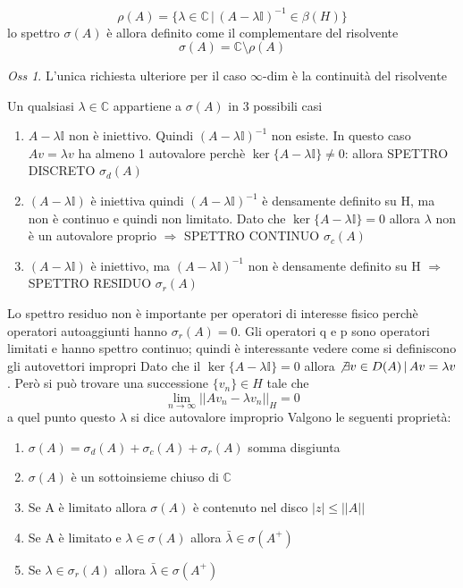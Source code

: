 \documentclass[a4paper,11pt]{report}
\theoremstyle{remark}
\newtheorem*{oss}{Oss}
\theoremstyle{definition}
\newcommand{\C}{\mathbb{C}}
\begin{document}
\begin{equation*}
	\rho(A) = \{\lambda\in\C \, | \, {(A-\lambda\mathbb{I})}^{-1}\in \beta(H)\}
\end{equation*}
lo spettro $\sigma(A)$ è allora definito come il complementare del risolvente
\begin{equation*}
	\sigma(A) = \C \setminus \rho(A)
\end{equation*}
\begin{oss}
	L'unica richiesta ulteriore per il caso $\infty$-dim è la continuità del risolvente
\end{oss}
Un qualsiasi $\lambda \in \C$ appartiene a $\sigma(A)$ in 3 possibili casi
\begin{enumerate}
	\item $A - \lambda\mathbb{I}$ non è iniettivo. Quindi ${(A - \lambda\mathbb{I})}^{-1}$ non esiste. In questo caso $Av=\lambda v$ ha almeno 1 autovalore perchè $\ker{\{A - \lambda\mathbb{I}\}} \neq 0$: allora SPETTRO DISCRETO $\sigma_d(A)$
	\item $(A - \lambda\mathbb{I})$ è iniettiva quindi ${(A - \lambda\mathbb{I})}^{-1}$ è densamente definito su H, ma non è continuo e quindi non limitato. Dato che $\ker{\{A - \lambda\mathbb{I}\}} = 0$ allora $\lambda$ non è un autovalore proprio $\Rightarrow$ SPETTRO CONTINUO $\sigma_c(A)$
	\item $(A - \lambda\mathbb{I})$ è iniettivo, ma ${(A - \lambda\mathbb{I})}^{-1}$ non è densamente definito su H $\Rightarrow$ SPETTRO RESIDUO $\sigma_r(A)$
\end{enumerate}
Lo spettro residuo non è importante per operatori di interesse fisico perchè operatori autoaggiunti hanno $\sigma_r(A) = 0$. Gli operatori q e p sono operatori limitati e hanno spettro continuo; quindi è interessante vedere come si definiscono gli autovettori impropri \newline
Dato che il $\ker{\{A - \lambda\mathbb{I}\}} = 0$ allora $\not\exists v \in D(A) \, | \, Av = \lambda v$. Però si può trovare una successione $\{v_n\}\in H $ tale che 
\begin{equation*}
	\lim_{n\to \infty} {||Av_n -\lambda v_n||}_H =0
\end{equation*}
a quel punto questo $\lambda$ si dice autovalore improprio \newline
Valgono le seguenti proprietà:
\begin{enumerate}
	\item $\sigma(A) = \sigma_d(A) + \sigma_c(A) + \sigma_r(A)$ somma disgiunta
	\item $\sigma(A)$ è un sottoinsieme chiuso di $\C$
	\item Se A è limitato allora $\sigma(A)$ è contenuto nel disco $|z| \leq ||A||$
	\item Se A è limitato e $\lambda \in \sigma(A)$ allora $\bar{\lambda} \in \sigma(A^+)$
	\item Se $\lambda \in \sigma_r(A)$ allora $\bar{\lambda} \in \sigma(A^+)$
\end{enumerate}
\end{document}

